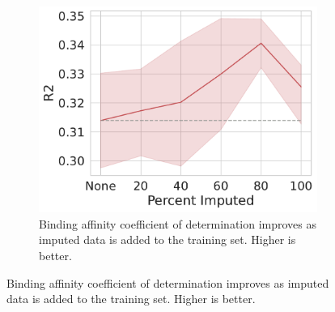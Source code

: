 \documentclass[journal=jcisd8,manuscript=article]{achemso}
\begin{document}
\begin{figure}[tbph]
    \centering
    \begin{subfigure}[t]{0.48\textwidth}
        \centering
        \includegraphics[width=\linewidth]{figures/MedGOEns_addingImpR2.pdf}
        \caption{Binding affinity coefficient of determination improves as imputed data is added to the training set. Higher is better.}
    \end{subfigure}


\end{figure}
\end{document}
